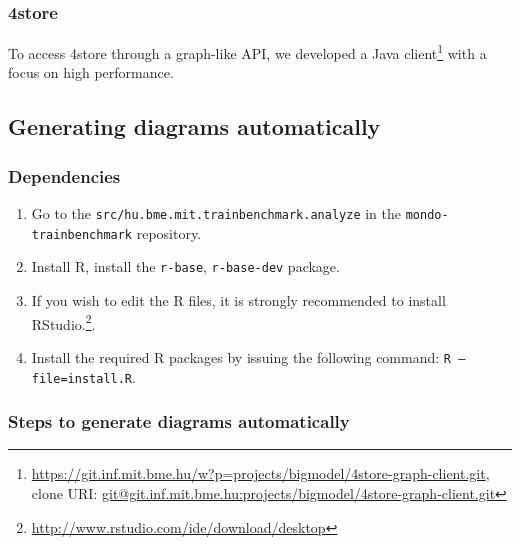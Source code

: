 \subsubsection{4store}

To access 4store through a graph-like API, we developed a Java client\footnote{\url{https://git.inf.mit.bme.hu/w?p=projects/bigmodel/4store-graph-client.git}, \\ clone URI: \url{git@git.inf.mit.bme.hu:projects/bigmodel/4store-graph-client.git}} with a focus on high performance.


\subsection{Generating diagrams automatically}

\subsubsection{Dependencies}

\begin{enumerate}
  \item Go to the \texttt{src/hu.bme.mit.trainbenchmark.analyze} in the \texttt{mondo-trainbenchmark} repository.
  \item Install R, install the \texttt{r-base}, \texttt{r-base-dev} package.
  \item If you wish to edit the R files, it is strongly recommended to install RStudio.\footnote{\url{http://www.rstudio.com/ide/download/desktop}}.
  \item Install the required R packages by issuing the following command: \texttt{R --file=install.R}. 
\end{enumerate}

\subsubsection{Steps to generate diagrams automatically}

